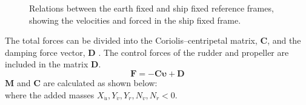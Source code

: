 \begin{figure}[h]
    \centering
    
    \caption{Relations between the earth fixed and ship fixed reference frames, showing the velocities and forced in the ship fixed frame.}
    \label{fig:reference_frames}
\end{figure}
The total forces can be divided into the Coriolis–centripetal matrix, $\mathbf{C}$, and the damping force vector, $\mathbf{D}$ \cite{fossenHandbookMarineCraft2011}. The control forces of the rudder and propeller are included in the matrix $\mathbf{D}$.
\begin{equation}
    \label{eq:upsilon1d}
\mathbf{F} = - \mathbf{C} \pmb{\upsilon} + \mathbf{D}
\end{equation}
$\mathbf{M}$ and $\mathbf{C}$ are calculated as shown below: 
\begin{equation}
    \label{eq:M_expanded}
    
\end{equation}
\begin{equation}
    \label{eq:C_expanded}
    
\end{equation}
where the added masses $X_{\dot{u}},Y_{\dot{v}},Y_{\dot{r}},N_{\dot{v}},N_{\dot{r}} < 0$. 

